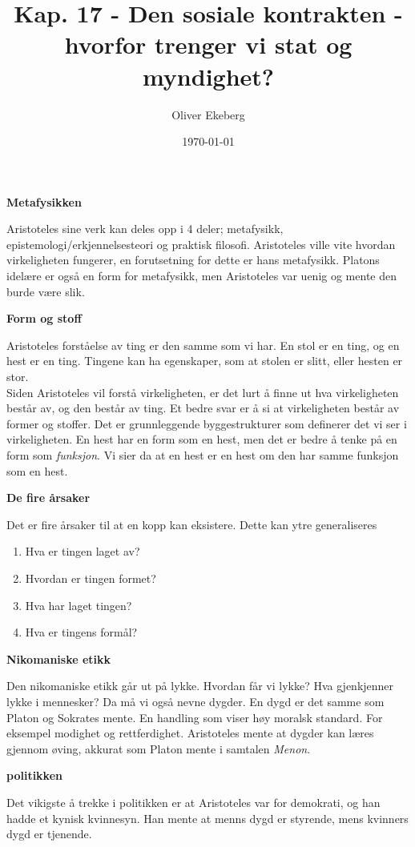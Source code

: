 \documentclass[11pt, a4paper]{article}
\title{Kap. 17 - Den sosiale kontrakten - hvorfor trenger vi stat og myndighet?}
\author{Oliver Ekeberg}
\date{\today}
\newenvironment{sectionbox}[1][]{%
    \begin{sectionboxinner}
    \textbf{\large #1}
    \vspace{1pt}
    \newline
}{%
    \end{sectionboxinner}
}
\newenvironment{subsectionbox}[1][]{%
    \begin{subsectionboxinner}
    \textbf{#1}
    \vspace{3pt}
    \newline
}{%
    \end{subsectionboxinner}
}
\begin{document}
\maketitle

\tableofcontents

\begin{sectionbox}[Metafysikken]

Aristoteles sine verk kan deles opp i 4 deler; metafysikk, epistemologi/erkjennelsesteori og praktisk filosofi. Aristoteles ville vite hvordan virkeligheten fungerer, en forutsetning for dette er hans metafysikk. Platons idelære er også en form for metafysikk, men Aristoteles var uenig og mente den burde være slik.


\begin{subsectionbox}[Form og stoff]
Aristoteles forståelse av ting er den samme som vi har. En stol er en ting, og en hest er en ting. Tingene kan ha egenskaper, som at stolen er slitt, eller hesten er stor.\\

Siden Aristoteles vil forstå virkeligheten, er det lurt å finne ut hva virkeligheten består av, og den består av ting. Et bedre svar er å si at virkeligheten består av former og stoffer. Det er grunnleggende byggestrukturer som definerer det vi ser i virkeligheten. En hest har en form som en hest, men det er bedre å tenke på en form som \textit{funksjon}. Vi sier da at en hest er en hest om den har samme funksjon som en hest.
\end{subsectionbox}


\begin{subsectionbox}[De fire årsaker]

Det er fire årsaker til at en kopp kan eksistere. Dette kan ytre generaliseres

\begin{enumerate}
    \item Hva er tingen laget av?
    \item Hvordan er tingen formet?
    \item Hva har laget tingen?
    \item Hva er tingens formål?
\end{enumerate}

\end{subsectionbox}

\end{sectionbox}


\begin{sectionbox}[Nikomaniske etikk]
Den nikomaniske etikk går ut på lykke. Hvordan får vi lykke? Hva gjenkjenner lykke i mennesker? Da må vi også nevne dygder. En dygd er det samme som Platon og Sokrates mente. En handling som viser høy moralsk standard. For eksempel modighet og rettferdighet. Aristoteles mente at dygder kan læres gjennom øving, akkurat som Platon mente i samtalen \textit{Menon}.
\end{sectionbox}

\begin{sectionbox}[politikken]
Det vikigste å trekke i politikken er at Aristoteles var for demokrati, og han hadde et kynisk kvinnesyn. Han mente at menns dygd er styrende, mens kvinners dygd er tjenende. 
\end{sectionbox}
\end{document}
